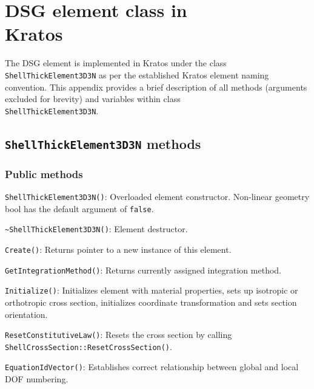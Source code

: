 
\chapter[DSG element class in Kratos]{DSG element class in \\ Kratos}
\label{app:DSG element as programmed in Kratos}
\renewcommand{\Thema}{DSG element class in Kratos}

The DSG element is implemented in Kratos under the class \texttt{ShellThickElement3D3N} as per the established Kratos element naming convention. This appendix provides a brief description of all methods (arguments excluded for brevity) and variables within class \\ \texttt{ShellThickElement3D3N}.

\section{\texttt{ShellThickElement3D3N} methods}
\subsection{Public methods}
\texttt{ShellThickElement3D3N()}: Overloaded element constructor. Non-linear geometry bool has the default argument of \texttt{false}.

\texttt{\textasciitilde ShellThickElement3D3N()}: Element destructor.

\texttt{Create()}: Returns pointer to a new instance of this element.

\texttt{GetIntegrationMethod()}: Returns currently assigned integration method.

\texttt{Initialize()}: Initializes element with material properties, sets up isotropic or orthotropic cross section, initializes coordinate transformation and sets section orientation.

\texttt{ResetConstitutiveLaw()}: Resets the cross section by calling \\ \texttt{ShellCrossSection::ResetCrossSection()}. 

\texttt{EquationIdVector()}: Establishes correct relationship between global and local DOF numbering.

